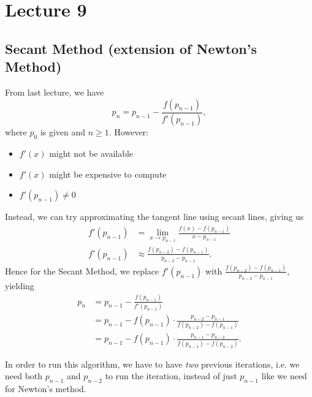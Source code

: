 \documentclass[class=article, crop=false]{standalone}
\begin{document}
  \section{Lecture 9}
  \subsection{Secant Method (extension of Newton's Method)}
  From last lecture, we have
  \[
    p_n = p_{n - 1} - \frac{f(p_{n - 1})}{f'(p_{n - 1})},
  \]
  where $p_0$ is given and $n \geq 1$. However:
  \begin{itemize}
    \item $f'(x)$ might not be available
    \item $f'(x)$ might be expensive to compute
    \item $f'(p_{n - 1})\neq 0$
  \end{itemize}
  Instead, we can try approximating the tangent line using secant lines, giving us
  \begin{align*}
    f'(p_{n - 1}) &= \lim_{x\to p_{n - 1}} \frac{f(x) - f(p_{n - 1})}{x - p_{n - 1}} \\
    f'(p_{n - 1}) &\approx \frac{f(p_{n - 2}) - f(p_{n - 1})}{p_{n - 2} - p_{n - 1}}.
  \end{align*}
  Hence for the Secant Method, we replace $f'(p_{n - 1})$ with $\displaystyle\frac{f(p_{n - 2}) - f(p_{n - 1})}{p_{n - 2} - p_{n - 1}}$, yielding
  \begin{align*}
    p_n &= p_{n - 1} - \frac{f(p_{n - 1})}{f'(p_{n - 1})} \\
        &= p_{n - 1} - f(p_{n - 1})\cdot \frac{p_{n - 2} - p_{n - 1}}{f(p_{n - 2}) - f(p_{n - 1})} \\
        &= p_{n - 1} - f(p_{n - 1})\cdot \frac{p_{n - 1} - p_{n - 2}}{f(p_{n - 1}) - f(p_{n - 2})}.
  \end{align*}
  \begin{note}{}
    In order to run this algorithm, we have to have \emph{two} previous iterations, i.e. we need both $p_{n - 1}$ and $p_{n - 2}$ to run the iteration, instead of just $p_{n - 1}$ like we need for Newton's method.
  \end{note}
\end{document}
